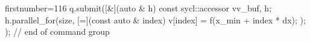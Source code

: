 \begin{cppcode*}{firstnumber=116}
        q.submit([&](auto & h) {
            const sycl::accessor v{v_buf, h};
            h.parallel_for(size, [=](const auto & index) {
                v[index] = f(x_min + index * dx);
            });
        }); // end of command group
\end{cppcode*}
